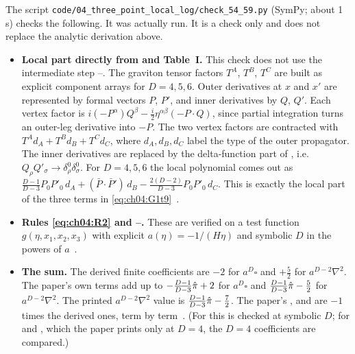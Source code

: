 The script \texttt{code/04\_three\_point\_local\_log/check\_54\_59.py} (SymPy; about 1\,s) checks the following.
It was actually run.
It is a check only and does not replace the analytic derivation above.
\begin{itemize}[leftmargin=1.2em,itemsep=3pt]
\item[(A)] \textbf{Local part directly from  and Table~I.}
This check does not use the intermediate step --.
The graviton tensor factors $T^A$, $T^B$, $T^C$ are built as explicit component arrays for $D=4,5,6$.
Outer derivatives at $x$ and $x'$ are represented by formal vectors $P$, $P'$, and inner derivatives by $Q$, $Q'$.
Each vertex factor is $i(-P^\alpha)Q^\beta-\frac i2\eta^{\alpha\beta}(-P\!\cdot\!Q)$, since partial integration turns an outer-leg derivative into $-P$.
The two vertex factors are contracted with $T^Ad_A+T^Bd_B+T^Cd_C$, where $d_A,d_B,d_C$ label the type of the outer propagator.
The inner derivatives are replaced by the delta-function part of , i.e.\ $Q_\rho Q'_\sigma\to\delta^0_\rho\delta^0_\sigma$.
For $D=4,5,6$ the local polynomial comes out as
$\frac{D-1}{D-3}P_0P'_0\,d_A+(\bar P\!\cdot\!\bar P')\,d_B-\frac{2(D-2)}{D-3}P_0P'_0\,d_C$.
This is exactly the local part of the three terms in \eqref{eq:ch04:G1t9}~\chIVok.
\item[(B)] \textbf{Rules \eqref{eq:ch04:R2} and --.}
These are verified on a test function $g(\eta,x_1,x_2,x_3)$ with explicit $a(\eta)=-1/(H\eta)$ and symbolic $D$ in the powers of $a$~\chIVok.
\item[(C)] \textbf{The sum.}
The derived finite coefficients are $-2$ for $a^D\square$ and $+\frac52$ for $a^{D-2}\nabla^2$.
The paper's own terms add up to $-\frac{D-1}{D-3}\hat\pi+2$ for $a^D\square$ and $\frac{D-1}{D-3}\hat\pi-\frac52$ for $a^{D-2}\nabla^2$.
The printed $a^{D-2}\nabla^2$ value is $\frac{D-1}{D-3}\hat\pi-\frac72$.
The paper's ,  and  are $-1$ times the derived ones, term by term~\chIVok.
(For  this is checked at symbolic $D$; for  and , which the paper prints only at $D=4$, the $D=4$ coefficients are compared.)
\end{itemize}

